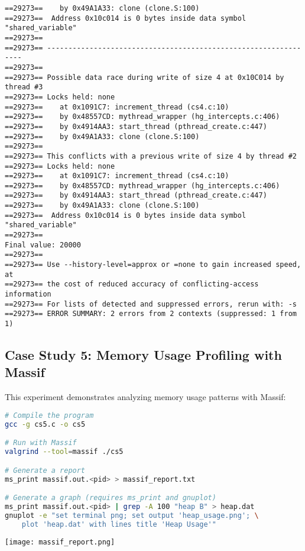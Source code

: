 \documentclass[11pt,a4paper]{article}
\begin{document}
\begin{verbatim}
==29273==    by 0x49A1A33: clone (clone.S:100)
==29273==  Address 0x10c014 is 0 bytes inside data symbol "shared_variable"
==29273== 
==29273== ----------------------------------------------------------------
==29273== 
==29273== Possible data race during write of size 4 at 0x10C014 by thread #3
==29273== Locks held: none
==29273==    at 0x1091C7: increment_thread (cs4.c:10)
==29273==    by 0x48557CD: mythread_wrapper (hg_intercepts.c:406)
==29273==    by 0x4914AA3: start_thread (pthread_create.c:447)
==29273==    by 0x49A1A33: clone (clone.S:100)
==29273== 
==29273== This conflicts with a previous write of size 4 by thread #2
==29273== Locks held: none
==29273==    at 0x1091C7: increment_thread (cs4.c:10)
==29273==    by 0x48557CD: mythread_wrapper (hg_intercepts.c:406)
==29273==    by 0x4914AA3: start_thread (pthread_create.c:447)
==29273==    by 0x49A1A33: clone (clone.S:100)
==29273==  Address 0x10c014 is 0 bytes inside data symbol "shared_variable"
==29273== 
Final value: 20000
==29273== 
==29273== Use --history-level=approx or =none to gain increased speed, at
==29273== the cost of reduced accuracy of conflicting-access information
==29273== For lists of detected and suppressed errors, rerun with: -s
==29273== ERROR SUMMARY: 2 errors from 2 contexts (suppressed: 1 from 1)

\end{verbatim}


\subsection{Case Study 5: Memory Usage Profiling with Massif}

This experiment demonstrates analyzing memory usage patterns with Massif:

\begin{lstlisting}[caption=Memory profiling with Massif, language=bash]
# Compile the program
gcc -g cs5.c -o cs5

# Run with Massif
valgrind --tool=massif ./cs5

# Generate a report
ms_print massif.out.<pid> > massif_report.txt

# Generate a graph (requires ms_print and gnuplot)
ms_print massif.out.<pid> | grep -A 100 "heap B" > heap.dat
gnuplot -e "set terminal png; set output 'heap_usage.png'; \
    plot 'heap.dat' with lines title 'Heap Usage'"
\end{lstlisting}

\begin{center}
    
    \texttt{[image: massif\_report.png]}
\end{center}
\end{document}
